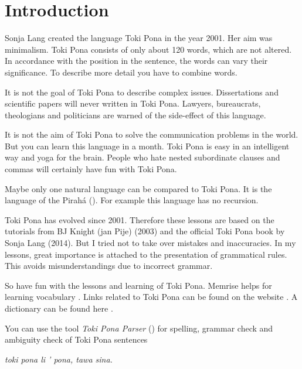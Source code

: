 
\section{Introduction}

Sonja Lang created the language Toki Pona in the year 2001.
Her aim was minimalism.
Toki Pona consists of only about 120 words, which are not altered.
In accordance with the position in the sentence, the words can vary their significance.
To describe more detail you have to combine words.

It is not the goal of Toki Pona to describe complex issues.
Dissertations and scientific papers will never written in Toki Pona.
Lawyers, bureaucrats, theologians and politicians are warned of the side-effect of this language.

It is not the aim of Toki Pona to solve the communication problems in the world.
But you can learn this language in a month.
Toki Pona is easy in an intelligent way and yoga for the brain.
People who hate nested subordinate clauses and commas will certainly have fun with Toki Pona.

Maybe only one natural language can be compared to Toki Pona.
It is the language of the Pirah\'{a} (\cite{www:piraha:01}).
For example this language has no recursion.

Toki Pona has evolved since 2001.
Therefore these lessons are based on the tutorials from BJ Knight (jan Pije) \cite{www:Pije:01} (2003) and the official Toki Pona book \cite{www:tokipona.org} by Sonja Lang (2014).
But I tried not to take over mistakes and inaccuracies.
In my lessons, great importance is attached to the presentation of grammatical rules.
This avoids misunderstandings due to incorrect grammar.

So have fun with the lessons and learning of Toki Pona.
Memrise helps for learning vocabulary \cite{www:memrise:01}. Links related to Toki Pona can be found on the website \cite{www:rowa:01}.
A dictionary can be found here \cite{www:rowa:01}.

You can use the tool \textit{Toki Pona Parser} (\cite{www:rowa:02}) for spelling, grammar check and ambiguity check of Toki Pona sentences

\textit{toki pona li ' pona, tawa sina.}